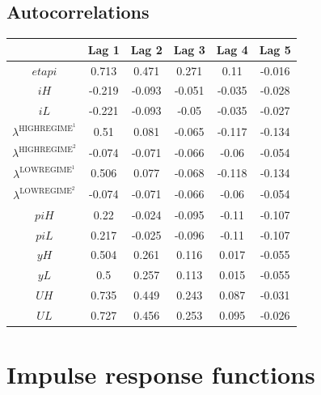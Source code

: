 \subsection{Autocorrelations}

\begin{tabular}{c|ccccc|}
  & Lag 1 & Lag 2 & Lag 3 & Lag 4 & Lag 5\\
\hline
${e\!t\!a\!p\!i}$ & 0.713 & 0.471 & 0.271 & 0.11 & -0.016 \\
${i\!H}$ & -0.219 & -0.093 & -0.051 & -0.035 & -0.028 \\
${i\!L}$ & -0.221 & -0.093 & -0.05 & -0.035 & -0.027 \\
$\lambda^{\mathrm{HIGHREGIME}^{\mathrm{1}}}$ & 0.51 & 0.081 & -0.065 & -0.117 & -0.134 \\
$\lambda^{\mathrm{HIGHREGIME}^{\mathrm{2}}}$ & -0.074 & -0.071 & -0.066 & -0.06 & -0.054 \\
$\lambda^{\mathrm{LOWREGIME}^{\mathrm{1}}}$ & 0.506 & 0.077 & -0.068 & -0.118 & -0.134 \\
$\lambda^{\mathrm{LOWREGIME}^{\mathrm{2}}}$ & -0.074 & -0.071 & -0.066 & -0.06 & -0.054 \\
${p\!i\!H}$ & 0.22 & -0.024 & -0.095 & -0.11 & -0.107 \\
${p\!i\!L}$ & 0.217 & -0.025 & -0.096 & -0.11 & -0.107 \\
${y\!H}$ & 0.504 & 0.261 & 0.116 & 0.017 & -0.055 \\
${y\!L}$ & 0.5 & 0.257 & 0.113 & 0.015 & -0.055 \\
${U\!H}$ & 0.735 & 0.449 & 0.243 & 0.087 & -0.031 \\
${U\!L}$ & 0.727 & 0.456 & 0.253 & 0.095 & -0.026 \\
\hline
\end{tabular}



\pagebreak

\section{Impulse response functions}


